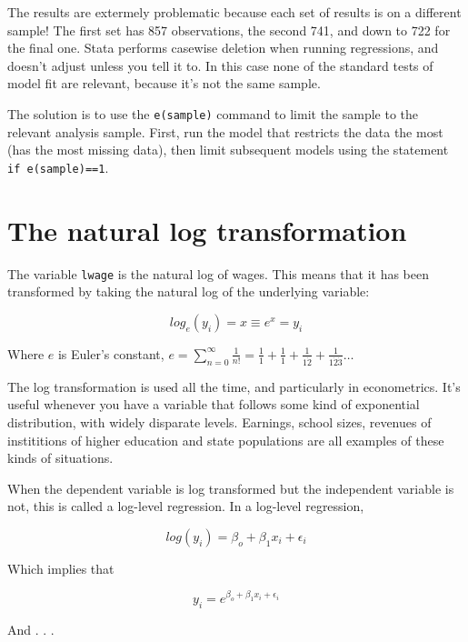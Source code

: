 \documentclass[12pt]{article}
\begin{document}
The results are extermely problematic because each set of results is
on a different sample! The first set has 857 observations, the second
741, and down to 722 for the final one. Stata performs casewise
deletion when running regressions, and doesn't adjust unless you tell
it to. In this case none of the standard tests of model fit are
relevant, because it's not the same sample. 

The solution is to use the \texttt{e(sample)} command to limit the
sample to the relevant analysis sample. First, run the model that
restricts the data the most (has the most missing data), then limit
subsequent models using the statement \texttt{if e(sample)==1}.

\section{The natural log transformation}

The variable \texttt{lwage} is the natural log of wages. This means
that it has been transformed by taking the natural log of the
underlying variable:

\begin{equation*}
  log_e(y_i)=x \equiv e^x=y_i
\end{equation*}


Where $e$ is Euler's constant, $e=\sum_{n=0}^\infty
\frac{1}{n!}=\frac{1}{1}+\frac{1}{1}+\frac{1}{1 \dot 2}+\frac{1}{1 \dot
  2 \dot 3} \ldots$

The log transformation is used all the time, and particularly in
econometrics. It's useful whenever you have a variable that follows
some kind of exponential distribution, with widely disparate
levels. Earnings, school sizes, revenues of instititions of higher
education and state populations are all examples of these kinds of
situations. 

When the dependent variable is log transformed but the independent
variable is not, this is called a log-level regression. In a log-level
regression,  


\begin{equation*}
  log(y_i)=\beta_o+\beta_1x_i+\epsilon_i
\end{equation*}

Which implies that

\begin{equation*}
  y_i=e^{\beta_o+\beta_1 x_i + \epsilon_i}
\end{equation*}

And . . .
\end{document}
